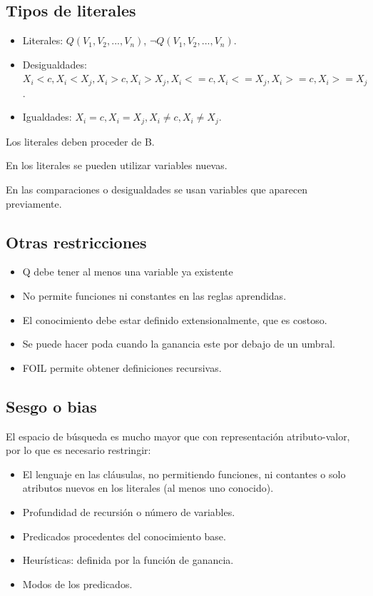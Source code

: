 \documentclass[12pt, twoside, openright]{report} %
\begin{document}
\subsection{Tipos de literales}
\begin{itemize}
  \item Literales: $Q(V_1, V_2, ..., V_n)$, $\neg Q(V_1, V_2, ..., V_n)$.
  \item Desigualdades: $X_i < c, X_i < X_j, X_i > c, X_i > X_j, X_i <= c, X_i <= X_j, X_i >= c, X_i >= X_j$.
  \item Igualdades: $X_i = c, X_i = X_j, X_i \neq c, X_i \neq X_j$.
\end{itemize}
Los literales deben proceder de B.

En los literales se pueden utilizar variables nuevas.

En las comparaciones o desigualdades se usan variables que aparecen previamente.

\subsection{Otras restricciones}
\begin{itemize}
  \item Q debe tener al menos una variable ya existente
  \item No permite funciones ni constantes en las reglas aprendidas.
  \item El conocimiento debe estar definido extensionalmente, que es costoso.
  \item Se puede hacer poda cuando la ganancia este por debajo de un umbral.
  \item FOIL permite obtener definiciones recursivas.
\end{itemize}

\subsection{Sesgo o bias}
El espacio de búsqueda es mucho mayor que con representación atributo-valor, por lo que es necesario restringir:
\begin{itemize}
  \item El lenguaje en las cláusulas, no permitiendo funciones, ni contantes o solo atributos nuevos en los literales (al menos uno conocido).
  \item Profundidad de recursión o número de variables.
  \item Predicados procedentes del conocimiento base.
  \item Heurísticas: definida por la función de ganancia.
  \item Modos de los predicados.
\end{itemize}
\end{document}
